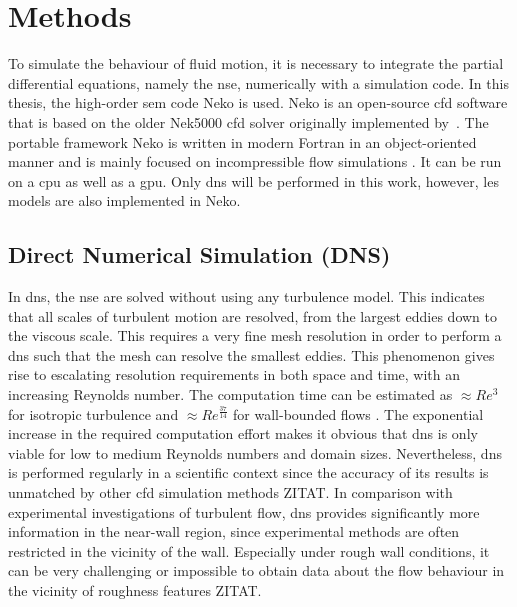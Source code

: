 \chapter{Methods}\label{chap: Methods}

To simulate the behaviour of fluid motion, it is necessary to integrate the partial differential equations, namely the \acrlong{nse}, numerically with a simulation code.
In this thesis, the high-order \acrfull{sem} code Neko is used.
Neko is an open-source \acrfull{cfd} software that is based on the older Nek5000 \acrshort{cfd} solver originally implemented by~\cite{fischerNek500WebPage}.
The portable framework Neko is written in modern Fortran in an object-oriented manner and is mainly focused on incompressible flow simulations \citep{janssonNekoModernPortable2024}.
It can be run on a \acrfull{cpu} as well as a \acrfull{gpu}.
Only \acrfull{dns} will be performed in this work, however, \acrfull{les} models are also implemented in Neko.

\section{Direct Numerical Simulation (DNS)}
In \acrshort{dns}, the \acrlong{nse} are solved without using any turbulence model.
This indicates that all scales of turbulent motion are resolved, from the largest eddies down to the viscous scale.
This requires a very fine mesh resolution in order to  perform a \acrshort{dns} such that the mesh can resolve the smallest eddies.
This phenomenon gives rise to escalating resolution requirements in both space and time, with an increasing Reynolds number.
The computation time can be estimated as  $\approx Re^3$ for isotropic turbulence and $\approx Re^\frac{37}{14}$ for wall-bounded flows \citep{choiGridpointRequirementsLarge2012}.
The exponential increase in the required computation effort makes it obvious that \acrshort{dns} is only viable for low to medium Reynolds numbers and domain sizes.
Nevertheless, \acrshort{dns} is performed regularly in a scientific context since the accuracy of its results is unmatched by other \acrshort{cfd} simulation methods ZITAT.
In comparison with experimental investigations of turbulent flow, \acrshort{dns} provides significantly more information in the near-wall region, since experimental methods  are  often restricted in the vicinity of the wall.
Especially under rough wall conditions, it can be very challenging or impossible to obtain data about the flow behaviour in the vicinity of roughness features ZITAT.

